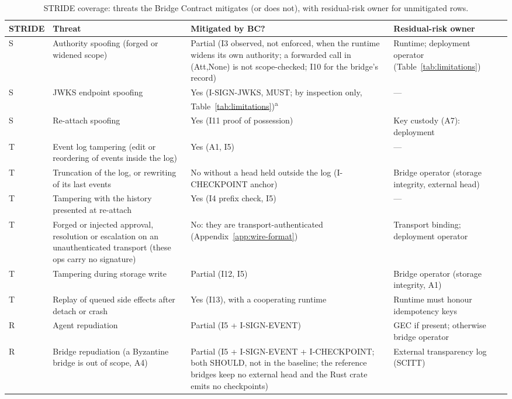 \begin{table}[htbp]
\centering
\caption{STRIDE coverage: threats the Bridge Contract mitigates
(or does not), with residual-risk owner for unmitigated rows.}
\label{tab:threats}
\small
\begin{tabularx}{\columnwidth}{l >{\raggedright\arraybackslash}X >{\raggedright\arraybackslash}X >{\raggedright\arraybackslash}X}
\toprule
\textbf{STRIDE} & \textbf{Threat} & \textbf{Mitigated by BC?} & \textbf{Residual-risk owner} \\
\midrule
S & Authority spoofing (forged or widened scope) & Partial (I3 observed, not enforced, when the runtime widens its own authority; a forwarded call in (Att,None) is not scope-checked; I10 for the bridge's record) & Runtime; deployment operator (Table~\ref{tab:limitations}) \\
S & JWKS endpoint spoofing & Yes (I-SIGN-JWKS, MUST; by inspection only, Table~\ref{tab:limitations})\textsuperscript{a} & --- \\
S & Re-attach spoofing & Yes (I11 proof of possession) & Key custody (A7): deployment \\
T & Event log tampering (edit or reordering of events inside the log) & Yes (A1, I5) & --- \\
T & Truncation of the log, or rewriting of its last events & No without a head held outside the log (I-CHECKPOINT anchor) & Bridge operator (storage integrity, external head) \\
T & Tampering with the history presented at re-attach & Yes (I4 prefix check, I5) & --- \\
T & Forged or injected approval, resolution or escalation on an unauthenticated transport (these ops carry no signature) & No: they are transport-authenticated (Appendix~\ref{app:wire-format}) & Transport binding; deployment operator \\
T & Tampering during storage write & Partial (I12, I5) & Bridge operator (storage integrity, A1) \\
T & Replay of queued side effects after detach or crash & Yes (I13), with a cooperating runtime & Runtime must honour idempotency keys \\
R & Agent repudiation & Partial (I5 + I-SIGN-EVENT) & GEC if present; otherwise bridge operator \\
R & Bridge repudiation (a Byzantine bridge is out of scope, A4) & Partial (I5 + I-SIGN-EVENT + I-CHECKPOINT; both SHOULD, not in the baseline; the reference bridges keep no external head and the Rust crate emits no checkpoints) & External transparency log (SCITT) \\

\end{tabularx}
\end{table}
